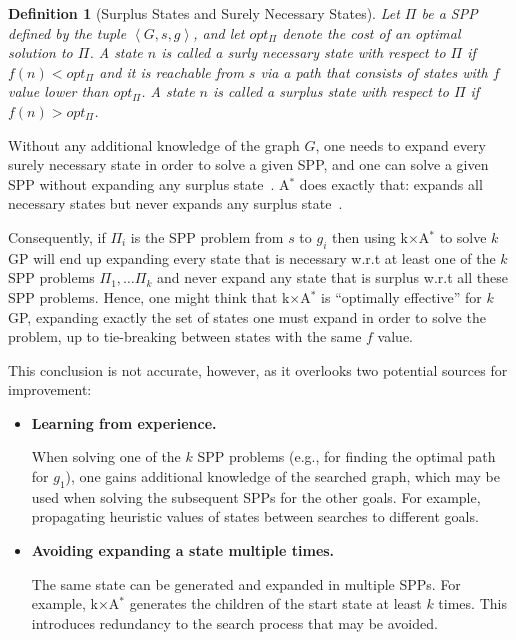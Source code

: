\documentclass{aicom2e}
\newtheorem{definition}{Definition}
\newcommand{\kgs}{$k$GP}
\newcommand{\astar}{A$^*$}
\newcommand{\kxastar}{k$\times$A$^*$}
\newcommand{\tuple}[1]{\ensuremath{\left \langle #1 \right \rangle }}
\begin{document}
\begin{definition}[Surplus States and Surely Necessary States]
    Let $\Pi$ be a SPP defined by the tuple $\tuple{G,s,g}$, and let $opt_\Pi$ denote the cost of an optimal solution to $\Pi$.
    A state $n$ is called a {\em surly necessary} state with respect to $\Pi$ if $f(n)<opt_\Pi$ 
    and it is reachable from $s$ via a path that consists of states with $f$ value lower than $opt_\Pi$. 
    A state $n$ is called a {\em surplus} state with respect to $\Pi$ if $f(n)>opt_\Pi$.
\label{def:surplus}
\end{definition}
Without any additional knowledge of the graph $G$, one needs to expand every surely necessary state in order to solve a given SPP,
and one can solve a given SPP without expanding any surplus state~\cite{dechter1985generalizedBestFirst,goldenberg2014enhanced}.
\astar{} does exactly that: expands all necessary states but never expands any surplus state~\cite{dechter1985generalizedBestFirst}.


Consequently, if $\Pi_i$ is the SPP problem from $s$ to $g_i$
then using \kxastar{} to solve \kgs{} will end up expanding every state that is necessary w.r.t at least one of the $k$ SPP problems $\Pi_1,\ldots \Pi_k$ and never expand any state that is surplus w.r.t all these SPP problems.
Hence, one might think that \kxastar{} is ``optimally effective'' for \kgs{},
expanding exactly the set of states one must expand in order to solve the problem, up to tie-breaking between states with the same $f$ value.


This conclusion is not accurate, however, as it overlooks two potential sources for improvement:
\begin{itemize}

\item {\bf Learning from experience.}

When solving one of the $k$ SPP problems (e.g., for finding the optimal path for $g_1$),
one gains additional knowledge of the searched graph, which may be used when solving the subsequent
SPPs for the other goals. For example, propagating heuristic values of states between searches to different goals.

\item {\bf Avoiding expanding a state multiple times.}

The same state can be generated and expanded in multiple SPPs. For example, \kxastar{}
generates the children of the start state at least $k$ times.
This introduces redundancy to the search process that may be avoided.
\end{itemize}
\end{document}
